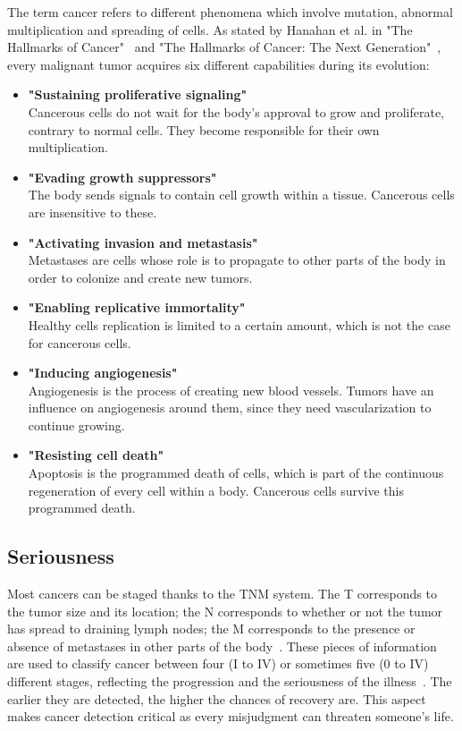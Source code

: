 The term cancer refers to different phenomena which involve mutation, abnormal multiplication and spreading of cells. As stated by Hanahan et al. in "The Hallmarks of Cancer"~\cite{19} and "The Hallmarks of Cancer: The Next Generation"~\cite{20}, every malignant tumor acquires six different capabilities during its evolution: 
\begin{itemize}
	\item \textbf{"Sustaining proliferative signaling"}\\ Cancerous cells do not wait for the body's approval to grow and proliferate, contrary to normal cells. They become responsible for their own multiplication.
	\item \textbf{"Evading growth suppressors"}\\
The body sends signals to contain cell growth within a tissue. Cancerous cells are insensitive to these. 
	\item \textbf{"Activating invasion and metastasis"}\\
Metastases are cells whose role is to propagate to other parts of the body in order to colonize and create new tumors. 
	\item \textbf{"Enabling replicative immortality"}\\
Healthy cells replication is limited to a certain amount, which is not the case for cancerous cells. 
	\item \textbf{"Inducing angiogenesis"}
\\Angiogenesis is the process of creating new blood vessels. Tumors have an influence on angiogenesis around them, since they need vascularization to continue growing. 
	\item \textbf{"Resisting cell death"}
\\Apoptosis is the programmed death of cells, which is part of the continuous regeneration of every cell within a body. Cancerous cells survive this programmed death. 
\end{itemize}


\subsection{Seriousness}
\setlength{\marginparwidth}{3cm}\leavevmode {}Most cancers can be staged thanks to the TNM system. The T corresponds to the tumor size and its location; the N corresponds to whether or not the tumor has spread to draining lymph nodes; the M corresponds to the presence or absence of metastases in other parts of the body~\cite{21}. These pieces of information are used to classify cancer between four (I to IV) or sometimes five (0 to IV) different stages, reflecting the progression and the seriousness of the illness~\cite{22}. The earlier they are detected, the higher the chances of recovery are. This aspect makes cancer detection critical as every misjudgment can threaten someone's life. 



